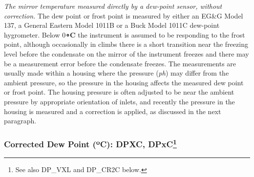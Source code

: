 \documentclass[
  english,
]{book}
\begin{document}
\emph{The mirror temperature measured directly by a dew-point sensor,
without correction.} The dew point or frost point is measured by either
an EG\&G Model 137, a General Eastern Model 1011B or a Buck Model 1011C
dew-point hygrometer. Below 0\textbf{{∘}C} the instrument is assumed to
be responding to the frost point, although occasionally in climbs there
is a short transition near the freezing level before the condensate on
the mirror of the instrument freezes and there may be a measurement
error before the condensate freezes. The measurements are usually made
within a housing where the pressure ({\emph{p}\emph{h})} may differ from
the ambient pressure, so the pressure in the housing affects the
measured dew point or frost point. The housing pressure is often
adjusted to be near the ambient pressure by appropriate orientation of
inlets, and recently the pressure in the housing is measured and a
correction is applied, as discussed in the next paragraph.

\hypertarget{dewpt-corrected}{%
\subsubsection*{\texorpdfstring{Corrected Dew Point ({º}C): DPXC,
DPxC\footnote{See also DP\_VXL and DP\_CR2C below.}}{Corrected Dew Point (ºC): DPXC, DPxC}}\label{dewpt-corrected}}
\end{document}
